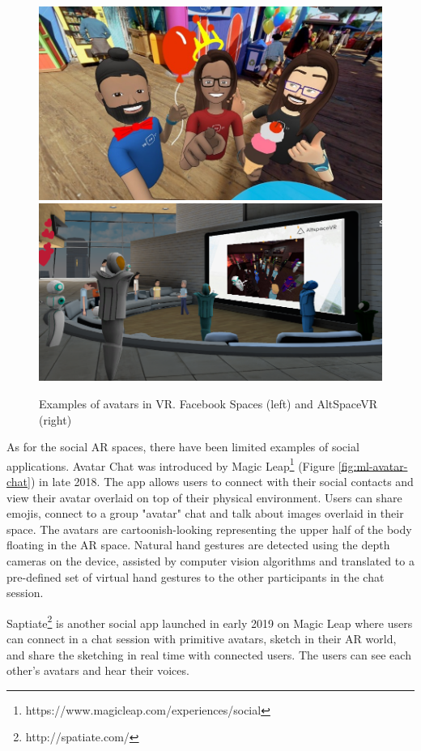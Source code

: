\begin{figure}
    \centering
    \includegraphics[width=.4\linewidth]{images/facebook-spaces.jpg}
    \includegraphics[width=.4\linewidth]{images/altspace-vr.png}
    \caption{Examples of avatars in VR. Facebook Spaces (left) and AltSpaceVR (right)}
    \label{fig:facebook-spaces}
\end{figure}

As for the social AR spaces, there have been limited examples of social applications. Avatar Chat was introduced by Magic Leap\footnote{https://www.magicleap.com/experiences/social} (Figure \ref{fig:ml-avatar-chat}) in late 2018. The app allows users to connect with their social contacts and view their avatar overlaid on top of their physical environment. Users can share emojis, connect to a group "avatar" chat and talk about images overlaid in their space. The avatars are cartoonish-looking representing the upper half of the body floating in the AR space. Natural hand gestures are detected using the depth cameras on the device, assisted by computer vision algorithms and translated to a pre-defined set of virtual hand gestures to the other participants in the chat session. 

Saptiate\footnote{http://spatiate.com/} is another social app launched in early 2019 on Magic Leap where users can connect in a chat session with primitive avatars, sketch in their AR world, and share the sketching in real time with connected users. The users can see each other's avatars and hear their voices. 

